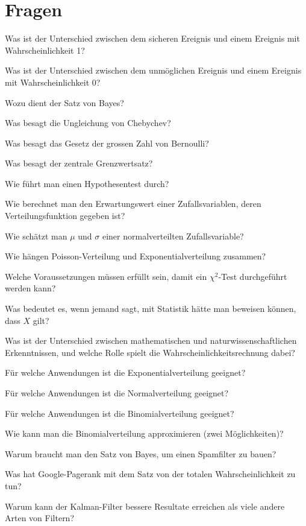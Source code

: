 \documentclass[a4paper,12pt,twocolumn]{article}
\begin{document}
\section{Fragen}
\begin{compactenum}
\item Was ist der Unterschied zwischen dem sicheren Ereignis und
einem Ereignis mit Wahrscheinlichkeit 1?
\item Was ist der Unterschied zwischen dem unmöglichen Ereignis
und einem Ereignis mit Wahrscheinlichkeit 0?
\item Wozu dient der Satz von Bayes?
\item Was besagt die Ungleichung von Chebychev?
\item Was besagt das Gesetz der grossen Zahl von Bernoulli?
\item Was besagt der zentrale Grenzwertsatz?
\item Wie führt man einen Hypothesentest durch?
\item Wie berechnet man den Erwartungswert einer Zufallsvariablen, deren
Verteilungsfunktion gegeben ist?
\item Wie schätzt man $\mu$ und $\sigma$ einer normalverteilten
Zufallsvariable?
\item Wie hängen Poisson-Verteilung und Exponentialverteilung zusammen?
\item Welche Voraussetzungen müssen erfüllt sein, damit ein $\chi^2$-Test
durchgeführt werden kann?
\item Was bedeutet es, wenn jemand sagt, mit Statistik hätte man beweisen
können, dass $X$ gilt?
\item Was ist der Unterschied zwischen mathematischen und
naturwissenschaftlichen Erkenntnissen, und welche Rolle spielt die
Wahrscheinlichkeitsrechnung dabei?
\item Für welche Anwendungen ist die Exponentialverteilung geeignet?
\item Für welche Anwendungen ist die Normalverteilung geeignet?
\item Für welche Anwendungen ist die Binomialverteilung geeignet?
\item Wie kann man die Binomialverteilung approximieren (zwei Möglichkeiten)?
\item Warum braucht man den Satz von Bayes, um einen Spamfilter zu bauen?
\item Was hat Google-Pagerank mit dem Satz von der totalen Wahrscheinlichkeit
zu tun?
\item Warum kann der Kalman-Filter bessere Resultate erreichen als viele
andere Arten von Filtern?
\end{compactenum}
\end{document}
